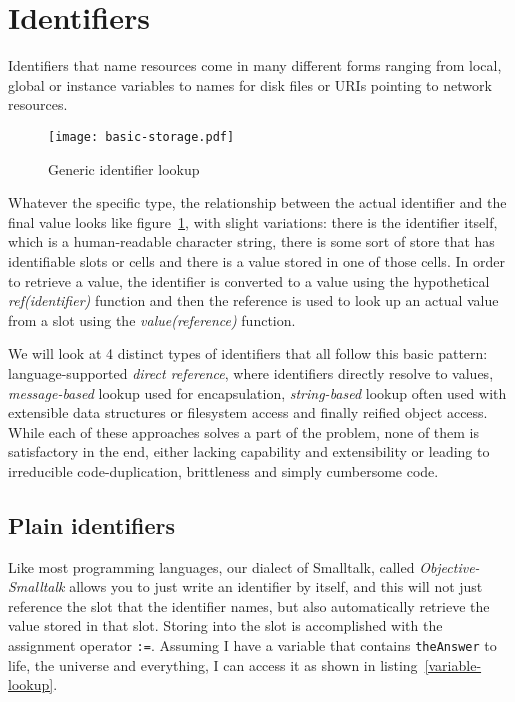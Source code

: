 \documentclass[preprint,authoryear]{acm_proc_article-sp}
\begin{document}





\section{Identifiers}
\label{identifiers}


Identifiers that name resources come in many different forms ranging from local,
global or instance variables to names for disk files or URIs pointing to network resources.

\begin{figure}[htbp]
\begin{center}
\texttt{[image: basic-storage.pdf]}
\caption{Generic identifier lookup}
\label{identifier-eval}
\end{center}
\end{figure}

Whatever the specific type, the relationship between the actual identifier and the
final value looks like figure~\ref{identifier-eval}, with slight variations:   there is
the identifier itself, which is a human-readable character string, there is some sort
of store that has identifiable slots or cells and there is a value stored in one of those
cells.   In order to retrieve a value, the identifier is converted to a value using the
hypothetical {\em ref(identifier)} function and then the reference is used to look up an actual
value from a slot using the {\em value(reference)} function.


We will look at 4 distinct types of identifiers that all follow this basic pattern:  language-supported 
{\em direct reference}, where identifiers directly resolve to values, {\em message-based} lookup
used for encapsulation,
{\em string-based} lookup often used with extensible data structures or filesystem access and
finally reified object access.   While each of these approaches solves a part of the problem,
none of them is satisfactory in the end, either lacking capability and extensibility or leading to
irreducible code-duplication, brittleness and simply cumbersome code.

\subsection{Plain identifiers}
\label{direct-reference}
Like most programming languages, our dialect of Smalltalk, called
{\em Objective-Smalltalk} allows you to just write 
an identifier by itself, and this will not just reference the slot that the identifier names, but also
automatically retrieve the value stored in that slot.  Storing into the slot is accomplished with
the assignment operator {\tt :=}.    Assuming I have a variable that contains {\tt theAnswer} to 
life, the universe and everything, I can access it as shown in listing~\ref{variable-lookup}.
\end{document}
